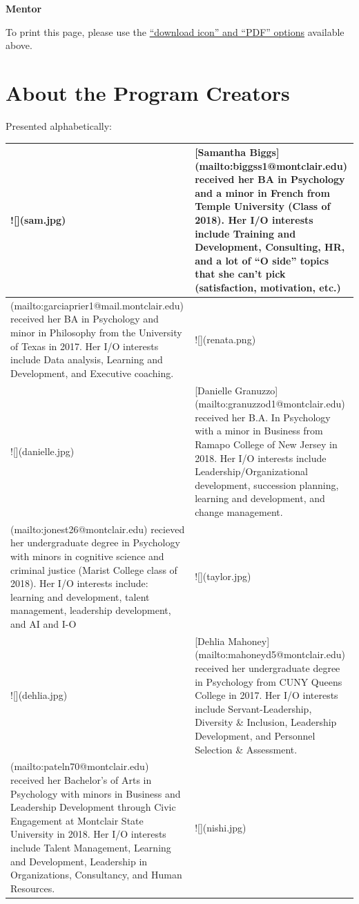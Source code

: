 \documentclass[
  openany]{book}
\begin{document}
\textbf{Mentor}

To print this page, please use the \href{snip.png}{``download icon'' and ``PDF'' options} available above.

\hypertarget{authors}{%
\chapter{About the Program Creators}\label{authors}}

Presented alphabetically:

\begin{tabular}{l|l}
\hline
![](sam.jpg) & [Samantha Biggs](mailto:biggss1@montclair.edu) received her BA in Psychology and a minor in French from Temple University (Class of 2018). Her I/O interests include Training and Development, Consulting, HR, and a lot of “O side” topics that she can’t pick (satisfaction, motivation, etc.)\\
\hline
[Renata Garcia Prieto Palacios Roji](mailto:garciaprier1@mail.montclair.edu) received her  BA in Psychology and minor in Philosophy from the University of Texas in 2017. Her I/O interests include Data analysis, Learning and Development, and Executive coaching. & ![](renata.png)\\
\hline
![](danielle.jpg) & [Danielle Granuzzo](mailto:granuzzod1@montclair.edu) received her B.A. In Psychology with a minor in Business from Ramapo College of New Jersey in 2018. Her I/O interests include Leadership/Organizational development, succession planning, learning and development, and change management.\\
\hline
[Taylor Jones](mailto:jonest26@montclair.edu) recieved her undergraduate degree in Psychology with minors in cognitive science and criminal justice (Marist College class of 2018). Her I/O interests include: learning and development, talent management,  leadership development, and AI and I-O & ![](taylor.jpg)\\
\hline
![](dehlia.jpg) & [Dehlia Mahoney](mailto:mahoneyd5@montclair.edu) received her undergraduate degree in Psychology from CUNY Queens College in 2017. Her I/O interests include  Servant-Leadership, Diversity \& Inclusion, Leadership Development, and Personnel Selection \& Assessment.\\
\hline
[Nishi Patel](mailto:pateln70@montclair.edu) received her Bachelor’s of Arts in Psychology with minors in Business and Leadership Development through Civic Engagement at Montclair State University in 2018. Her I/O interests include Talent Management, Learning and Development, Leadership in Organizations, Consultancy, and Human Resources. & ![](nishi.jpg)\\

\end{tabular}
\end{document}
